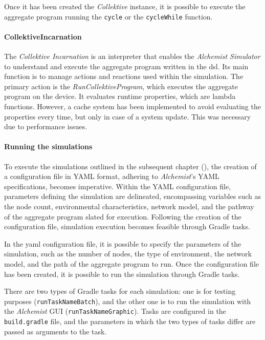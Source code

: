 Once it has been created the \emph{Collektive} instance, it is possible to execute the aggregate program running the \texttt{cycle}
or the \texttt{cycleWhile} function.

\paragraph{CollektiveIncarnation}
The \emph{Collektive Incarnation} is an interpreter that enables the \emph{Alchemist Simulator} to understand and execute
the aggregate program written in the \ac{dsl}.
Its main function is to manage actions and reactions used within the simulation.
The primary action is the \emph{RunCollektiveProgram}, which executes the aggregate program on the device.
It evaluates runtime properties, which are lambda functions.
However, a cache system has been implemented to avoid evaluating the properties every time, but only in case of a system update.
This was necessary due to performance issues.

\paragraph{Running the simulations}
To execute the simulations outlined in the subsequent chapter (), the creation of a
configuration file in YAML format, adhering to \emph{Alchemist}'s YAML specifications, becomes imperative. %
Within the YAML configuration file, parameters defining the simulation are delineated, encompassing variables such as
the node count, environmental characteristics, network model, and the pathway of the aggregate program slated for execution.
Following the creation of the configuration file, simulation execution becomes feasible through Gradle tasks.

In the yaml configuration file, it is possible to specify the parameters of the simulation, such as the number of nodes,
the type of environment, the network model, and the path of the aggregate program to run.
Once the configuration file has been created, it is possible to run the simulation through Gradle tasks.

There are two types of Gradle tasks for each simulation: one is for testing purposes (\texttt{runTaskNameBatch}), and the other
one is to run the simulation with the \emph{Alchemist} GUI (\texttt{runTaskNameGraphic}).
Tasks are configured in the \texttt{build.gradle} file, and the parameters in which the two types of tasks differ are
passed as arguments to the task.